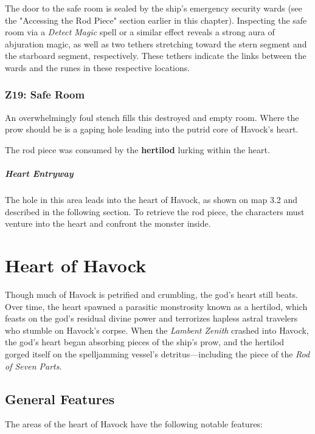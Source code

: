\documentclass[10pt,a4paper,twoside,bg=print,twocolumn,openany,nodeprecatedcode]{dndbook}
\begin{document}
The door to the safe room is sealed by the ship's emergency security wards (see the "Accessing the Rod Piece" section earlier in this chapter). Inspecting the safe room via a \textit{Detect Magic} spell or a similar effect reveals a strong aura of abjuration magic, as well as two tethers stretching toward the stern segment and the starboard segment, respectively. These tethers indicate the links between the wards and the runes in these respective locations.

\subsubsection{Z19: Safe Room}
\begin{DndReadAloud}{}
An overwhelmingly foul stench fills this destroyed and empty room. Where the prow should be is a gaping hole leading into the putrid core of Havock's heart.

\end{DndReadAloud}

The rod piece was consumed by the \textbf{hertilod} lurking within the heart.

\subparagraph{Heart Entryway}
The hole in this area leads into the heart of Havock, as shown on map 3.2 and described in the following section. To retrieve the rod piece, the characters must venture into the heart and confront the monster inside.

\section{Heart of Havock}
Though much of Havock is petrified and crumbling, the god's heart still beats. Over time, the heart spawned a parasitic monstrosity known as a hertilod, which feasts on the god's residual divine power and terrorizes hapless astral travelers who stumble on Havock's corpse. When the \textit{Lambent Zenith} crashed into Havock, the god's heart began absorbing pieces of the ship's prow, and the hertilod gorged itself on the spelljamming vessel's detritus—including the piece of the \textit{Rod of Seven Parts}.

\subsection{General Features}
The areas of the heart of Havock have the following notable features:
\end{document}
